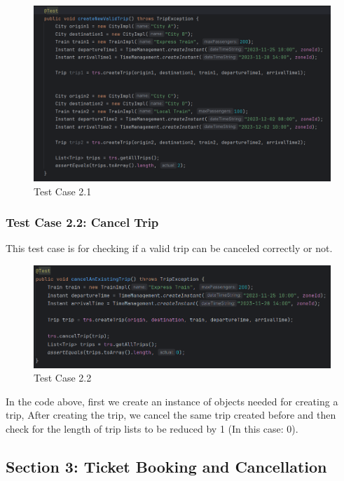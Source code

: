 \documentclass{article}
\begin{document}
\begin{figure}[h]
  \centering
  \includegraphics[width=1.0\textwidth]{pictures/T2-1.png}
  \caption{Test Case 2.1}
  \label{fig:your_label}
\end{figure}

\pagebreak

\subsubsection{Test Case 2.2: Cancel Trip}
This test case is for checking if a valid trip can be canceled correctly or not.

\begin{figure}[h]
  \centering
  \includegraphics[width=1.0\textwidth]{pictures/T2-2.png}
  \caption{Test Case 2.2}
  \label{fig:your_label}
\end{figure}

In the code above, first we create an instance of objects needed for creating a trip, After creating the trip, we cancel the same trip created before and then check for the length of trip lists to be reduced by 1 (In this case: 0).

\pagebreak

\subsection{Section 3: Ticket Booking and Cancellation}
\end{document}

